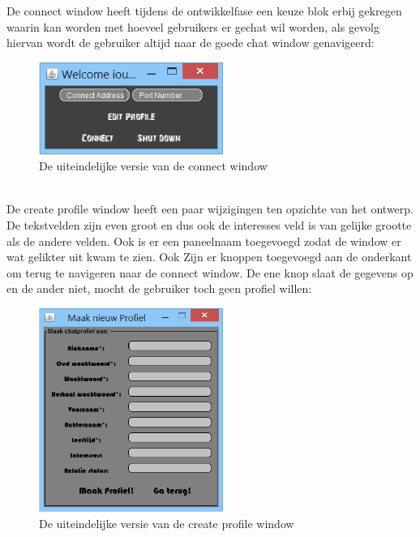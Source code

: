 \documentclass[12pt]{article}
\begin{document}
\noindent De connect window heeft tijdens de ontwikkelfase een keuze blok erbij gekregen waarin kan worden met hoeveel gebruikers er gechat wil worden, als gevolg hiervan wordt de gebruiker altijd naar de goede chat window genavigeerd:
\begin{figure}[ht]
\begin{center}
\includegraphics[width = 60mm]{connection_met_profiel}
\caption{De uiteindelijke versie van de connect window}
\label{figure011}
\end{center}
\end{figure}
\\

\noindent De create profile window heeft een paar wijzigingen ten opzichte van het ontwerp. De tekstvelden zijn even groot en dus ook de interesses veld is van gelijke grootte als de andere velden. Ook is er een paneelnaam toegevoegd zodat de window er wat gelikter uit kwam te zien. Ook Zijn er knoppen toegevoegd aan de onderkant om terug te navigeren naar de connect window. De ene knop slaat de gegevens op en de ander niet, mocht de gebruiker toch geen profiel willen:
\begin{figure}[ht]
\begin{center}
\includegraphics[width = 60mm]{MaakProfielGUI}
\caption{De uiteindelijke versie van de create profile window}
\label{figure012}
\end{center}
\end{figure}
\\
\end{document}

